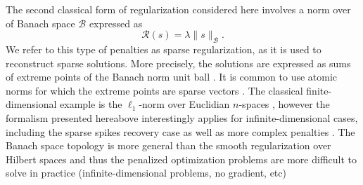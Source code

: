 \documentclass[12pt]{article}
\begin{document}
    The second classical form of regularization considered here involves a norm over of Banach space $\mathcal{B}$ expressed as
    \begin{equation*}
        \mathcal{R} (s) = \lambda \| s \|_{\mathcal{B}}.
    \end{equation*}
    We refer to this type of penalties as sparse regularization, as it is used to reconstruct sparse solutions. More precisely, the solutions are expressed as sums of extreme points of the Banach norm unit ball \cite{boyer2019representer,Unser2020}. It is common to use atomic norms for which the extreme points are sparse vectors \cite{chandrasekaran2012convex}.
    The classical finite-dimensional example is the $\ell_1$-norm over Euclidian $n$-spaces \cite{tibshirani1996regression,chen2001atomic}, however the formalism presented hereabove interestingly applies for infinite-dimensional cases, including the sparse spikes recovery case \cite{laville2021sparse} as well as more complex penalties \cite{laville2023a,ambrosio2023,decastro2024}.
    The Banach space topology is more general than the smooth regularization over Hilbert spaces and thus the penalized optimization problems are more difficult to solve in practice (infinite-dimensional problems, no gradient, etc)
    
\end{document}
